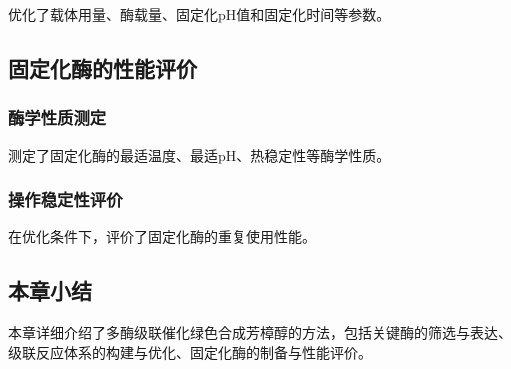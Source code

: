 
优化了载体用量、酶载量、固定化pH值和固定化时间等参数。

\subsection{固定化酶的性能评价}

\subsubsection{酶学性质测定}


测定了固定化酶的最适温度、最适pH、热稳定性等酶学性质。

\subsubsection{操作稳定性评价}


在优化条件下，评价了固定化酶的重复使用性能。

\subsection{本章小结}


本章详细介绍了多酶级联催化绿色合成芳樟醇的方法，包括关键酶的筛选与表达、级联反应体系的构建与优化、固定化酶的制备与性能评价。
